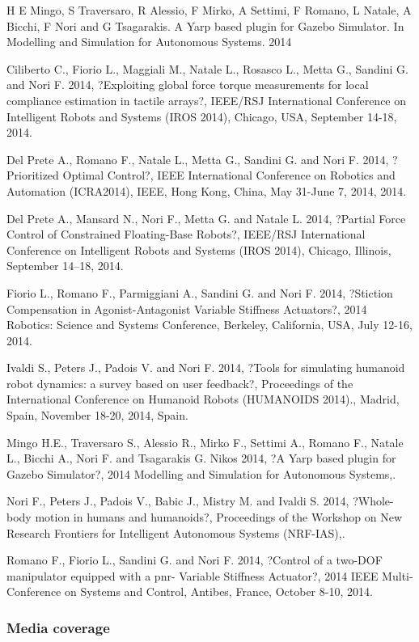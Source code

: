 H E Mingo, S Traversaro, R Alessio, F Mirko, A Settimi, F Romano, L Natale, A Bicchi, F Nori and G Tsagarakis. A Yarp based plugin for Gazebo Simulator. In Modelling and Simulation for Autonomous Systems. 2014

Ciliberto C., Fiorio L., Maggiali M., Natale L., Rosasco L., Metta G., Sandini G. and Nori F. 2014, ?Exploiting global force torque measurements for local compliance estimation in tactile arrays?, IEEE/RSJ International Conference on Intelligent Robots and Systems (IROS 2014), Chicago, USA, September 14-18, 2014.

Del Prete A., Romano F., Natale L., Metta G., Sandini G. and Nori F. 2014, ?Prioritized Optimal Control?, IEEE International Conference on Robotics and Automation (ICRA2014), IEEE, Hong Kong, China, May 31-June 7, 2014, 2014.

Del Prete A., Mansard N., Nori F., Metta G. and Natale L. 2014, ?Partial Force Control of Constrained Floating-Base Robots?, IEEE/RSJ International Conference on Intelligent Robots and Systems (IROS 2014), Chicago, Illinois, September 14–18, 2014.

Fiorio L., Romano F., Parmiggiani A., Sandini G. and Nori F. 2014, ?Stiction Compensation in Agonist-Antagonist Variable Stiffness Actuators?, 2014 Robotics: Science and Systems Conference, Berkeley, California, USA, July 12-16, 2014.

Ivaldi S., Peters J., Padois V. and Nori F. 2014, ?Tools for simulating humanoid robot dynamics: a survey based on user feedback?, Proceedings of the International Conference on Humanoid Robots (HUMANOIDS 2014)., Madrid, Spain, November 18-20, 2014, Spain.

Mingo H.E., Traversaro S., Alessio R., Mirko F., Settimi A., Romano F., Natale L., Bicchi A., Nori F. and Tsagarakis G. Nikos 2014, ?A Yarp based plugin for Gazebo Simulator?, 2014 Modelling and Simulation for Autonomous Systems,.

Nori F., Peters J., Padois V., Babic J., Mistry M. and Ivaldi S. 2014, ?Whole-body motion in humans and humanoids?, Proceedings of the Workshop on New Research Frontiers for Intelligent Autonomous Systems (NRF-IAS),.

Romano F., Fiorio L., Sandini G. and Nori F. 2014, ?Control of a two-DOF manipulator equipped with a pnr- Variable Stiffness Actuator?, 2014 IEEE Multi-Conference on Systems and Control, Antibes, France, October 8-10, 2014.

\subsubsection{Media coverage}

